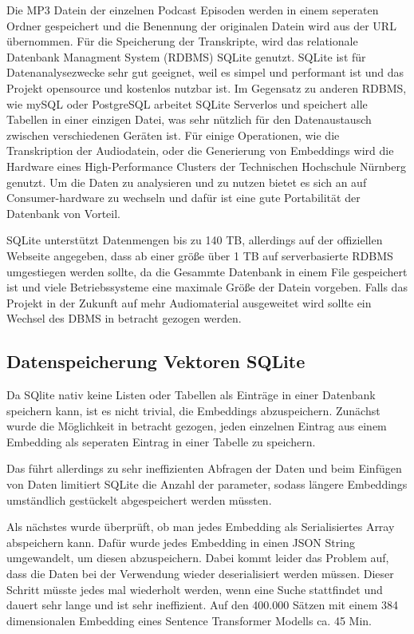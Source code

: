 Die MP3 Datein der einzelnen Podcast Episoden werden in einem seperaten Ordner gespeichert und die Benennung der originalen Datein wird aus der URL übernommen.
Für die Speicherung der Transkripte, wird das relationale Datenbank Managment System (RDBMS) SQLite  genutzt.
SQLite ist für Datenanalysezwecke sehr gut geeignet, weil es simpel und performant ist und das Projekt opensource und kostenlos nutzbar ist.
Im Gegensatz zu anderen RDBMS, wie mySQL oder PostgreSQL arbeitet SQLite Serverlos und speichert alle Tabellen in einer einzigen Datei, was sehr nützlich für den Datenaustausch zwischen verschiedenen Geräten ist.
Für einige Operationen, wie die Transkription der Audiodatein, oder die Generierung von Embeddings wird die Hardware eines High-Performance Clusters der Technischen Hochschule Nürnberg genutzt. 
Um die Daten zu analysieren und zu nutzen bietet es sich an auf Consumer-hardware zu wechseln und dafür ist eine gute Portabilität der Datenbank von Vorteil.

SQLite unterstützt Datenmengen bis zu 140 TB, allerdings auf der offiziellen Webseite angegeben, dass ab einer größe über 1 TB auf serverbasierte RDBMS umgestiegen werden sollte, da die Gesammte Datenbank in einem File gespeichert ist und viele Betriebssysteme eine maximale Größe der Datein vorgeben.
Falls das Projekt in der Zukunft auf mehr Audiomaterial ausgeweitet wird sollte ein Wechsel des DBMS in betracht gezogen werden.

\subsection{Datenspeicherung Vektoren SQLite}

Da SQlite nativ keine Listen oder Tabellen als Einträge in einer Datenbank speichern kann, ist es nicht trivial, die Embeddings abzuspeichern.
Zunächst wurde die Möglichkeit in betracht gezogen, jeden einzelnen Eintrag aus einem Embedding als seperaten Eintrag in einer Tabelle zu speichern. 

Das führt allerdings zu sehr ineffizienten Abfragen der Daten und beim Einfügen von Daten limitiert SQLite die Anzahl der parameter, sodass längere Embeddings umständlich gestückelt abgespeichert werden müssten.

Als nächstes wurde überprüft, ob man jedes Embedding als Serialisiertes Array abspeichern kann.
Dafür wurde jedes Embedding in einen JSON String umgewandelt, um diesen abzuspeichern. 
Dabei kommt leider das Problem auf, dass die Daten bei der Verwendung wieder deserialisiert werden müssen.
Dieser Schritt müsste jedes mal wiederholt werden, wenn eine Suche stattfindet und dauert sehr lange und ist sehr ineffizient. 
Auf den 400.000 Sätzen mit einem 384 dimensionalen Embedding eines Sentence Transformer Modells ca. 45 Min.


